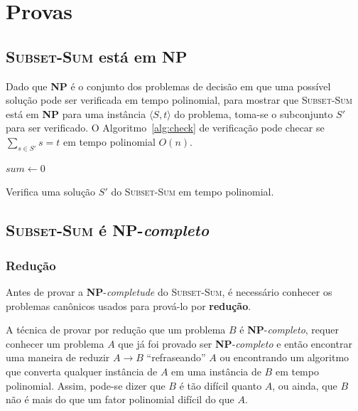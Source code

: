\newpage
\section{Provas}

\subsection{\textsc{Subset-Sum} está em \textbf{NP}}

Dado que \textbf{NP} é o conjunto dos problemas de decisão em que uma possível solução pode ser verificada em tempo polinomial, para mostrar que \textsc{Subset-Sum} está em \textbf{NP} para uma instância $\langle S, t \rangle$ do problema, toma-se o subconjunto $S'$ para ser verificado. O Algoritmo~\ref{alg:check} de verificação pode checar se $\sum_{s \in S'} s = t$ em tempo polinomial $O(n)$.

\begin{algorithm}[h]

	$sum \leftarrow 0$\;
	\;
\caption{Verifica uma solução $S'$ do \textsc{Subset-Sum} em tempo polinomial. \label{alg:check}}
\end{algorithm}

\subsection{\textsc{Subset-Sum} é \textbf{NP}-\textit{completo}}

\subsubsection{Redução}

Antes de provar a \textbf{NP}-\textit{completude} do \textsc{Subset-Sum}, é necessário conhecer os problemas canônicos usados para prová-lo por \textbf{redução}.

A técnica de provar por redução que um problema $B$ é \textbf{NP}-\textit{completo}, requer conhecer um problema $A$ que já foi provado ser \textbf{NP}-\textit{completo} e então encontrar uma maneira de reduzir $A \rightarrow B$ ``refraseando'' $A$ ou encontrando um algoritmo que converta qualquer instância de $A$ em uma instância de $B$ em tempo polinomial. Assim, pode-se dizer que $B$ é tão difícil quanto $A$, ou ainda, que $B$ não é mais do que um fator polinomial difícil do que $A$.

